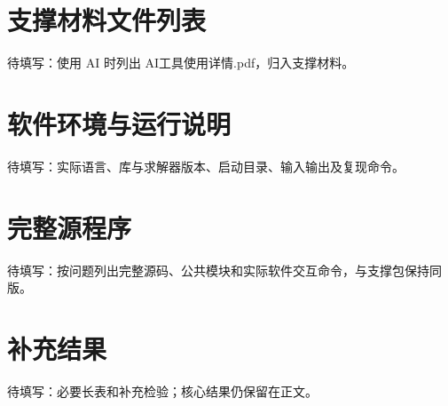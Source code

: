 \documentclass[withoutpreface]{cumcmthesis}
\begin{document}
\clearpage
\begin{appendices}
\section{支撑材料文件列表}
待填写：使用 AI 时列出 AI工具使用详情.pdf，归入支撑材料。
\section{软件环境与运行说明}
待填写：实际语言、库与求解器版本、启动目录、输入输出及复现命令。
\section{完整源程序}
待填写：按问题列出完整源码、公共模块和实际软件交互命令，与支撑包保持同版。
\section{补充结果}
待填写：必要长表和补充检验；核心结果仍保留在正文。
\end{appendices}
\end{document}
